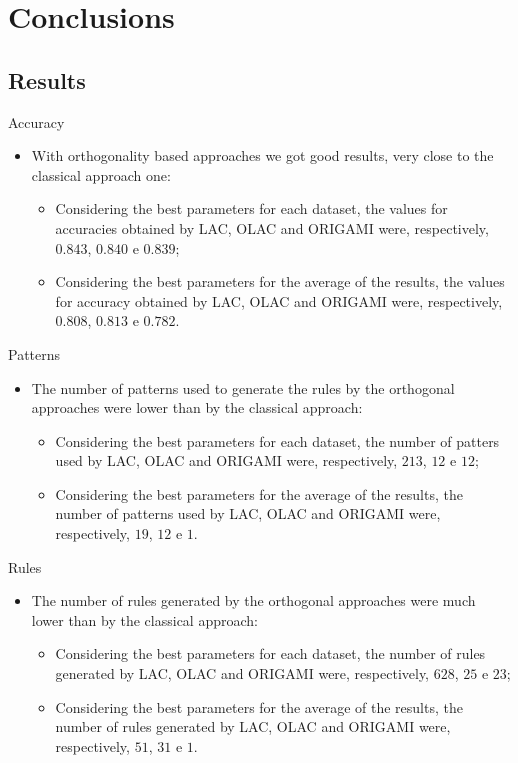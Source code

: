 \section{Conclusions}
\subsection{Results}

\begin{frame}{Accuracy}
	\begin{itemize}[<+-| alert@+>]
		\item With orthogonality based approaches we got good results, very close to the classical approach one:
		\begin{itemize}[<+-| alert@+>]
			\item Considering the best parameters for each dataset, the values for accuracies obtained by LAC, OLAC and ORIGAMI were, respectively, $0.843$, $0.840$ e $ 0.839$;
			\item Considering the best parameters for the average of the results, the values for accuracy obtained by LAC, OLAC and ORIGAMI were, respectively, $0.808$, $0.813$ e $0.782$.
		\end{itemize}
	\end{itemize}
\end{frame}

\begin{frame}{Patterns}
	\begin{itemize}[<+-| alert@+>]
		\item The number of patterns used to generate the rules by the orthogonal approaches were lower than by the classical approach:
		\begin{itemize}[<+-| alert@+>]
			\item Considering the best parameters for each dataset, the number of patters used by LAC, OLAC and ORIGAMI were, respectively, $213$, $12$ e $12$;
			\item Considering the best parameters for the average of the results, the number of patterns used by LAC, OLAC and ORIGAMI were, respectively, $19$, $12$ e $1$.
		\end{itemize}
	\end{itemize}
\end{frame}

\begin{frame}{Rules}
	\begin{itemize}[<+-| alert@+>]
		\item The number of rules generated by the orthogonal approaches were much lower than by the classical approach:
		\begin{itemize}[<+-| alert@+>]
			\item Considering the best parameters for each dataset, the number of rules generated by LAC, OLAC and ORIGAMI were, respectively, $628$, $25$ e $23$;
			\item Considering the best parameters for the average of the results, the number of rules generated by LAC, OLAC and ORIGAMI were, respectively, $51$, $31$ e $1$.
		\end{itemize}
	\end{itemize}
\end{frame}

